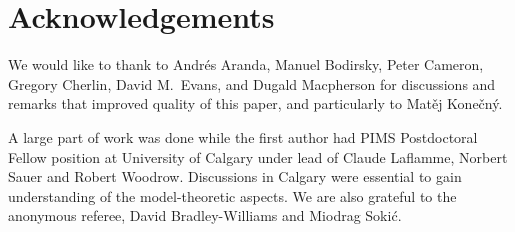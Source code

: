 \documentclass{elsarticle}
\theoremstyle{plain}
\theoremstyle{definition}
\theoremstyle{remark}
\begin{document}
\section{Acknowledgements}
We would like to thank to Andr\'es Aranda, Manuel Bodirsky, Peter Cameron, Gregory Cherlin, David M.~Evans, and
Dugald Macpherson for discussions and remarks that improved quality of this
paper, and particularly to Mat\v ej Kone\v cn\'y.

A large part of work was done while the first author had PIMS Postdoctoral
Fellow position at University of Calgary under lead of Claude Laflamme,
Norbert Sauer and Robert Woodrow. Discussions in Calgary were essential to gain
understanding of the model-theoretic aspects.  We are also
grateful to the anonymous referee, David Bradley-Williams and Miodrag Soki{\'c}.




\end{document}
